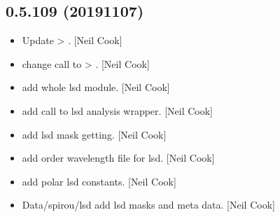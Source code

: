 \documentclass[a4paper,10pt,english]{report}
\begin{document}
\subsection{0.5.109 (2019\sphinxhyphen{}11\sphinxhyphen{}07)}
\label{\detokenize{misc/changelog:id52}}\begin{itemize}
\item {} 
Update  \textendash{}\textgreater{} . {[}Neil Cook{]}

\item {} 
 \sphinxhyphen{} change call to 
\textendash{}\textgreater{} . {[}Neil Cook{]}

\item {} 
 \sphinxhyphen{} add whole lsd module. {[}Neil Cook{]}

\item {} 
 \sphinxhyphen{} add call to lsd analysis wrapper.
{[}Neil Cook{]}

\item {} 
 \sphinxhyphen{} add lsd mask getting. {[}Neil Cook{]}

\item {} 
 \sphinxhyphen{} add order wavelength file for
lsd. {[}Neil Cook{]}

\item {} 
 \sphinxhyphen{} add polar lsd constants.
{[}Neil Cook{]}

\item {} 
Data/spirou/lsd \sphinxhyphen{} add lsd masks and meta data. {[}Neil Cook{]}

\end{itemize}
\end{document}
